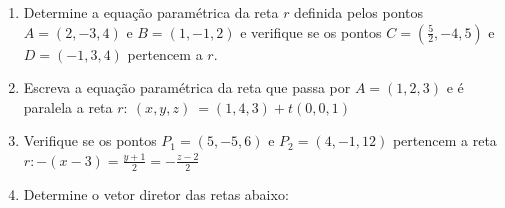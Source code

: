 \documentclass[a4paper,5pt]{amsbook}
\newcommand{\ds}{\displaystyle}
\begin{document}
\begin{enumerate}
	\vspace{0.3cm}
	\item Determine a equa\c{c}\~ao param\'etrica da reta $r$ definida pelos pontos $A
		= (2, -3, 4)$ e $B = (1, -1, 2)$ e verifique se os pontos $C =
		(\frac{5}{2}, -4, 5)$ e $D = (-1, 3, 4)$ pertencem a $r$.
	
	\vspace{0.3cm}
	\item Escreva a equa\c{c}\~ao param\'etrica da reta que passa por $A = (1, 2, 3)$ e
		\'e paralela a reta $r:~(x, y, z)~=(1, 4, 3) + t(0, 0, 1)$
	
	\vspace{0.3cm}
	\item Verifique se os pontos $P_1 = (5, -5, 6)$ e $P_2 = (4, -1, 12)$
		pertencem a reta $\displaystyle r: -(x-3) = \frac{y+1}{2} =
		-\frac{z-2}{2}$
	
	\vspace{0.3cm}
	\item Determine o vetor diretor das retas abaixo:

	

\end{enumerate}
\end{document}
